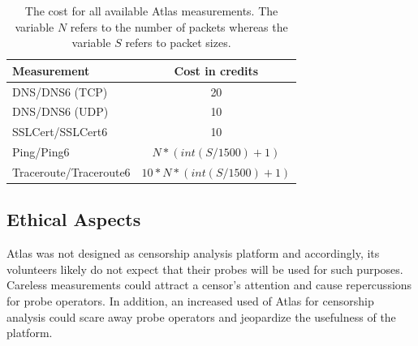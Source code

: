 %
%
%

% 

\begin{table}[t]
\centering
\begin{tabular}{lc}
\textbf{Measurement} & \textbf{Cost in credits} \\
\hline 
DNS\slash DNS6 (TCP) & 20\\ 
DNS\slash DNS6 (UDP) & 10\\ 
SSLCert\slash SSLCert6 & 10 \\
Ping\slash Ping6 & $N * (int(S/1500)+1)$\\
Traceroute\slash Traceroute6 & $ 10*N*(int(S/1500)+1)$\\[1ex] 
\hline 
\end{tabular} 
\caption{The cost for all available Atlas measurements.  The variable $N$
refers to the number of packets whereas the variable $S$ refers to packet
sizes.}
\label{tab:cost} 
\end{table}

\subsection{Ethical Aspects}
Atlas was not designed as censorship analysis platform and accordingly, its
volunteers likely do not expect that their probes will be used for such
purposes.  Careless measurements could attract a censor's attention and cause
repercussions for probe operators.  In addition, an increased used of Atlas for
censorship analysis could scare away probe operators and jeopardize the
usefulness of the platform.

